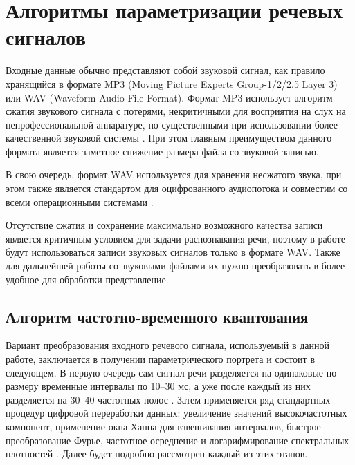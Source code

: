 
\section{Алгоритмы параметризации речевых сигналов} \label{sect1_2}

Входные данные обычно представляют собой звуковой сигнал, как правило хранящийся в формате MP3 (Moving Picture Experts Group-1/2/2.5 Layer 3) или WAV (Waveform Audio File Format).
Формат MP3 использует алгоритм сжатия звукового сигнала с потерями, некритичными для восприятия на слух на непрофессиональной аппаратуре, но существенными при использовании более качественной звуковой системы \cite{mp3}.
При этом главным преимуществом данного формата является заметное снижение размера файла со звуковой записью.

В свою очередь, формат WAV используется для хранения несжатого звука, при этом также является стандартом для оцифрованного аудиопотока и совместим со всеми операционными системами \cite{wav}.

Отсутствие сжатия и сохранение максимально возможного качества записи является критичным условием для задачи распознавания речи, поэтому в работе будут использоваться записи звуковых сигналов только в формате WAV.
Также для дальнейшей работы со звуковыми файлами их нужно преобразовать в более удобное для обработки представление.


\subsection{Алгоритм частотно-временного квантования} \label{sect1_2_1}

Вариант преобразования входного речевого сигнала, используемый в данной работе, заключается в получении параметрического портрета и состоит в следующем.
В первую очередь сам сигнал речи разделяется на одинаковые по размеру временные интервалы по 10--30 мс, а уже после каждый из них разделяется на 30--40 частотных полос \cite{evdokimenkov2015use, kolokolov2015compare}.
Затем применяется ряд стандартных процедур цифровой переработки данных: увеличение значений высокочастотных компонент, применение окна Ханна для взвешивания интервалов, быстрое преобразование Фурье, частотное осреднение и логарифмирование спектральных плотностей \cite{kolokolov2006obrabotka, oppenheim1999discrete}.
Далее будет подробно рассмотрен каждый из этих этапов.

